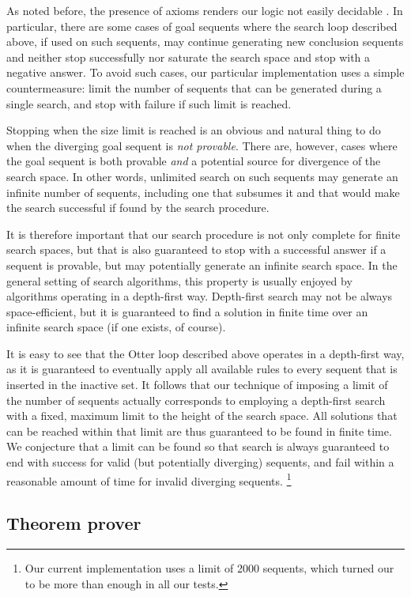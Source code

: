 As noted before, the presence of axioms renders our logic not easily decidable
\cite{mell-dec}. In particular, there are some cases of goal sequents where the
search loop described above, if used on such sequents, may continue generating
new conclusion sequents and neither stop successfully nor saturate the search
space and stop with a negative answer. To avoid such cases, our particular
implementation uses a simple countermeasure: limit the number of sequents that
can be generated during a single search, and stop with failure if such limit is
reached.

Stopping when the size limit is reached is an obvious and natural thing to do
when the diverging goal sequent is \emph{not provable}.
There are, however, cases where the goal sequent is both provable \emph{and}
a potential source for divergence of the search space. In other words, unlimited
search on such sequents may generate an infinite number of sequents, including
one that subsumes it and that would make the search successful if found by the
search procedure.

It is therefore important that our search procedure is not only complete for
finite search spaces, but that is also guaranteed to stop with a successful
answer if a sequent is provable, but may potentially generate an infinite search
space. In the general setting of search algorithms, this property is usually
enjoyed by algorithms operating in a depth-first way. Depth-first search may not
be always space-efficient, but it is guaranteed to find a solution in finite
time over an infinite search space (if one exists, of course).

It is easy to see that the Otter loop described above operates in a depth-first
way, as it is guaranteed to eventually apply all available rules to every
sequent that is inserted in the inactive set. It follows that our technique of
imposing a limit of the number of sequents actually corresponds to employing a
depth-first search with a fixed, maximum limit to the height of the search
space. All solutions that can be reached within that limit are thus guaranteed
to be found in finite time. We conjecture that a limit can be found so that
search is always guaranteed to end with success for valid (but potentially
diverging) sequents, and fail within a reasonable amount of time for invalid
diverging sequents.
\footnote{Our current implementation uses a limit of 2000 sequents, which turned
  our to be more than enough in all our tests.}

\subsection{Theorem prover}

